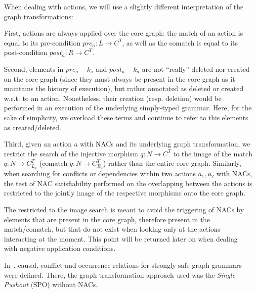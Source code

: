 \begin{remark} When dealing with actions, we will use a slightly different interpretation of the graph transformations:
  
First, actions are always applied over the core graph: the match of an action is equal to its pre-condition $pre_a : L \rightarrow C^T$, as well as the comatch is equal to its post-condition $post_a : R \rightarrow C^T$. 
  
  Second, elements in $pre_a - k_a$ and $post_a - k_a$ are not ``really'' deleted nor created on the core graph (since they must always be present in the core graph as it maintains the history of execution), but rather annotated as deleted or created w.r.t. to an action. Nonetheless, their creation (resp. deletion) would be performed in an execution of the underlying simply-typed grammar. Here, for the sake of simplicity, we overload these terms and continue to refer to this elements as created/deleted.

  Third, given an action $a$ with NACs and its underlying graph transformation, we restrict the search of the injective morphism $q : N \rightarrow C^T$ to the image of the match $q : N \rightarrow C^T_{L_a}$ (comatch $q : N \rightarrow C^T_{R_a}$) rather than the entire core graph. Similarly, when searching for conflicts or dependencies within two actions $a_1, a_2$ with NACs, the test of NAC satisfiability performed on the overlapping between the actions is restricted to the jointly image of the respective morphisms onto the core graph.

  The restricted to the image search is meant to avoid the triggering of NACs by elements that are present in the core graph, therefore present in the match/comatch, but that do not exist when looking only at the actions interacting at the moment. This point will be returned later on when dealing with negative application conditions.
\end{remark}

In~\cite{Ribeiro1996}, causal, conflict and occurrence relations for strongly safe graph grammars were defined. There, the graph transformation approach used was the \emph{Single Pushout} (SPO) without NACs. 

